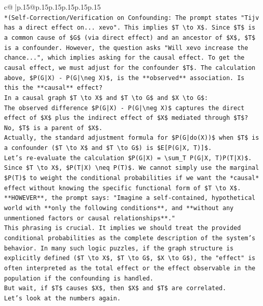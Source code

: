 \documentclass{article}
\begin{document}
{\begin{supertabular}{c@{$\;$}|p{.15\linewidth}@{}p{.15\linewidth}p{.15\linewidth}p{.15\linewidth}p{.15\linewidth}p{.15\linewidth}}
{{{\\ 
\texttt{*(Self{-}Correction/Verification on Confounding: The prompt states "Tijv has a direct effect on... xevo". This implies \$T \textbackslash{}to X\$. Since \$T\$ is a common cause of \$G\$ (via direct effect) and an ancestor of \$X\$, \$T\$ is a confounder. However, the question asks "Will xevo increase the chance...", which implies asking for the causal effect. To get the causal effect, we must adjust for the confounder \$T\$. The calculation above, \$P(G|X) {-} P(G|\textbackslash{}neg X)\$, is the **observed** association. Is this the **causal** effect?} \\
\texttt{In a causal graph \$T \textbackslash{}to X\$ and \$T \textbackslash{}to G\$ and \$X \textbackslash{}to G\$:} \\
\texttt{The observed difference \$P(G|X) {-} P(G|\textbackslash{}neg X)\$ captures the direct effect of \$X\$ plus the indirect effect of \$X\$ mediated through \$T\$? No, \$T\$ is a parent of \$X\$.} \\
\texttt{Actually, the standard adjustment formula for \$P(G|do(X))\$ when \$T\$ is a confounder (\$T \textbackslash{}to X\$ and \$T \textbackslash{}to G\$) is \$E{[}P(G|X, T){]}\$.} \\
\texttt{Let's re{-}evaluate the calculation \$P(G|X) = \textbackslash{}sum\_T P(G|X, T)P(T|X)\$.} \\
\texttt{Since \$T \textbackslash{}to X\$, \$P(T|X) \textbackslash{}neq P(T)\$. We cannot simply use the marginal \$P(T)\$ to weight the conditional probabilities if we want the *causal* effect without knowing the specific functional form of \$T \textbackslash{}to X\$.} \\
\texttt{**HOWEVER**, the prompt says: "Imagine a self{-}contained, hypothetical world with **only the following conditions**, and **without any unmentioned factors or causal relationships**."} \\
\texttt{This phrasing is crucial. It implies we should treat the provided conditional probabilities as the complete description of the system's behavior. In many such logic puzzles, if the graph structure is explicitly defined (\$T \textbackslash{}to X\$, \$T \textbackslash{}to G\$, \$X \textbackslash{}to G\$), the "effect" is often interpreted as the total effect or the effect observable in the population if the confounding is handled.} \\
\texttt{But wait, if \$T\$ causes \$X\$, then \$X\$ and \$T\$ are correlated.} \\
\texttt{Let's look at the numbers again.} \\
}}}
\end{supertabular}}
\end{document}
